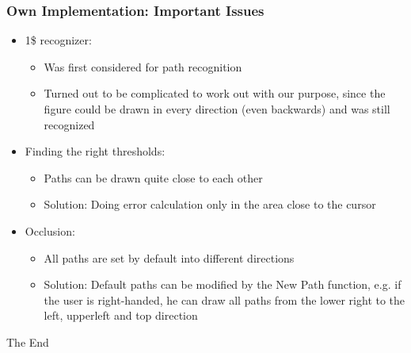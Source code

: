 \documentclass{beamer}
\begin{document}
\begin{frame}
\frametitle{Own Implementation: Important Issues}

\begin{itemize}
\item 1\$ recognizer:
	\begin{itemize}
	\item Was first considered for path recognition
	\item Turned out to be complicated to work out with our purpose, since the figure could be drawn in every direction (even backwards) and was still recognized \newline
	\end{itemize}
\item Finding the right thresholds:
	\begin{itemize}
	\item Paths can be drawn quite close to each other
	\item Solution: Doing error calculation only in the area close to the cursor \newline
	\end{itemize}
\item Occlusion:
	\begin{itemize}
	\item All paths are set by default into different directions
	\item Solution: Default paths can be modified by the \grqq New Path \grqq function, e.g. if the user is right-handed, he can draw all paths from the lower right to the left, upperleft and top direction
	\end{itemize}

\end{itemize}

\end{frame}




\begin{frame}
\Huge{\centerline{The End}}
\end{frame}

\end{document}
